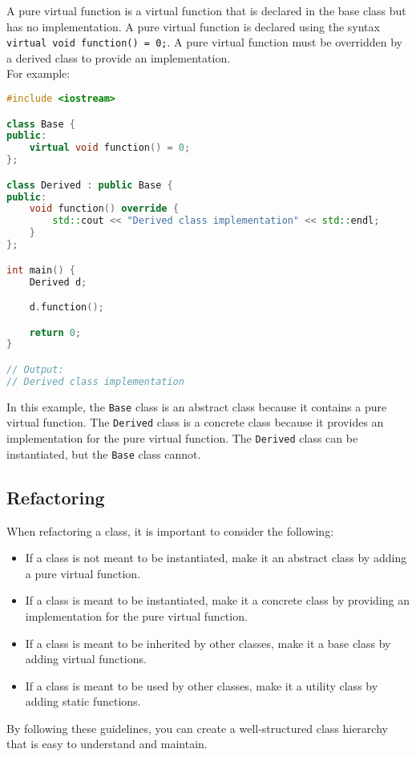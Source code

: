 A pure virtual function is a virtual function that is declared in the base class but has no
implementation. A pure virtual function is declared using the syntax \texttt{virtual void function() = 0;}.
A pure virtual function must be overridden by a derived class to provide an implementation.\\

For example:\\

\begin{lstlisting}[language=C++]
#include <iostream>

class Base {
public:
    virtual void function() = 0;
};

class Derived : public Base {
public:
    void function() override {
        std::cout << "Derived class implementation" << std::endl;
    }
};

int main() {
    Derived d;

    d.function();

    return 0;
}

// Output:
// Derived class implementation
\end{lstlisting}

In this example, the \texttt{Base} class is an abstract class because it contains a pure virtual
function. The \texttt{Derived} class is a concrete class because it provides an implementation
for the pure virtual function. The \texttt{Derived} class can be instantiated, but the \texttt{Base}
class cannot.

\subsection{Refactoring}

When refactoring a class, it is important to consider the following:

\begin{itemize}
    \item If a class is not meant to be instantiated, make it an abstract class by adding
    a pure virtual function.
    \item If a class is meant to be instantiated, make it a concrete class by providing
    an implementation for the pure virtual function.
    \item If a class is meant to be inherited by other classes, make it a base class by
    adding virtual functions.
    \item If a class is meant to be used by other classes, make it a utility class by
    adding static functions.
\end{itemize}

By following these guidelines, you can create a well-structured class hierarchy that is
easy to understand and maintain.